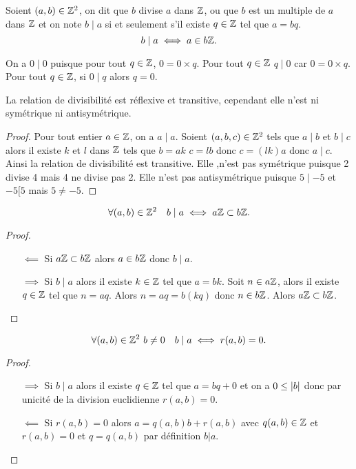 \begin{defdef}
  Soient $(a,b) \in \mathbb{Z}^2$, on dit que $b$ divise $a$ dans $\mathbb{Z}$, ou que $b$ est un multiple de $a$ dans $\mathbb{Z}$ et on note $b\mid a$ si et seulement s'il existe $q \in \mathbb{Z}$ tel que $a=bq$.
  \begin{equation}
    b\mid a \iff a \in b\mathbb{Z}.
  \end{equation}
\end{defdef}
 On a $0\mid 0$ puisque pour tout $q \in \mathbb{Z}$, $0=0 \times q$. Pour tout $q \in \mathbb{Z}$ $q\mid 0$ car $0=0 \times q$. Pour tout $q \in \mathbb{Z}$, si $0\mid q$ alors $q=0$.

 \begin{prop}
   La relation de divisibilité est réflexive et transitive, cependant elle n'est ni symétrique ni antisymétrique.
 \end{prop}
 \begin{proof}
   Pour tout entier $a \in \mathbb{Z}$, on a $a\mid a$. Soient $(a,b,c) \in \mathbb{Z}^2$ tels que $a\mid b$ et $b\mid c$ alors il existe $k$ et $l$ dans $\mathbb{Z}$ tels que $b=ak$ $c=lb$ donc $c=(lk)a$ donc $a\mid c$. Ainsi la relation de divisibilité est transitive. Elle ,n'est pas symétrique puisque 2 divise 4 mais 4 ne divise pas 2. Elle n'est pas antisymétrique puisque $5\mid -5$ et $-5[5$ mais $5 \neq -5$.
 \end{proof}
 \begin{prop}
   \begin{equation}
     \forall (a,b) \in \mathbb{Z}^2 \quad b\mid a \iff a\mathbb{Z} \subset b\mathbb{Z}.
   \end{equation}
 \end{prop}
 \begin{proof}
   \begin{itemize}
   \item[$\impliedby$] Si $a\mathbb{Z} \subset b\mathbb{Z}$ alors $a \in b\mathbb{Z}$ donc $b\mid a$.
   \item[$\implies$] Si $b\mid a$ alors il existe $k \in \mathbb{Z}$ tel que $a=bk$. Soit $n \in a\mathbb{Z}$, alors il existe $q \in \mathbb{Z}$ tel que $n=aq$. Alors $n=aq=b(kq)$ donc $n \in b\mathbb{Z}$. Alors $a\mathbb{Z} \subset b\mathbb{Z}$.
   \end{itemize}
 \end{proof}
 \begin{prop}
   \begin{equation}
     \forall (a,b) \in \mathbb{Z}^2 \ b\neq 0 \quad b\mid a \iff r(a,b)=0.
   \end{equation}
 \end{prop}
 \begin{proof}
   \begin{itemize}
   \item[$\implies$] Si $b\mid a$ alors il existe $q \in \mathbb{Z}$ tel que $a=bq+0$ et on a $0\leq \left\lvert b\right\rvert$ donc par unicité de la division euclidienne $r(a,b)=0$.
   \item[$\impliedby$] Si $r(a,b)=0$ alors $a=q(a,b) b+r(a,b)$ avec $q(a,b) \in \mathbb{Z}$ et $r(a,b)=0$ et $q=q(a,b)$ par définition $b|a$.
   \end{itemize}
 \end{proof}

